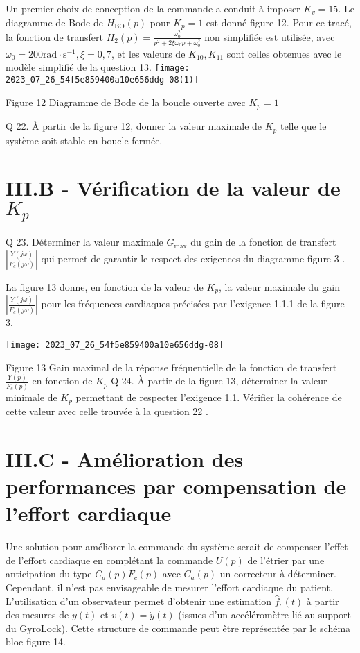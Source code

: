 Un premier choix de conception de la commande a conduit à imposer $K_{v}=15$. Le diagramme de Bode de $H_{\mathrm{BO}}(p)$ pour $K_{p}=1$ est donné figure 12. Pour ce tracé, la fonction de transfert $H_{2}(p)=\frac{\omega_{0}^{2}}{p^{2}+2 \xi \omega_{0} p+\omega_{0}^{2}}$ non simplifiée est utilisée, avec $\omega_{0}=200 \mathrm{rad} \cdot \mathrm{s}^{-1}, \xi=0,7$, et les valeurs de $K_{10}, K_{11}$ sont celles obtenues avec le modèle simplifié de la question 13.
\texttt{[image: 2023\_07\_26\_54f5e859400a10e656ddg-08(1)]}

Figure 12 Diagramme de Bode de la boucle ouverte avec $K_{p}=1$

Q 22. À partir de la figure 12, donner la valeur maximale de $K_{p}$ telle que le système soit stable en boucle fermée.

\section{III.B - Vérification de la valeur de $K_{p}$}
Q 23. Déterminer la valeur maximale $G_{\max }$ du gain de la fonction de transfert $\left|\frac{Y(j \omega)}{F_{c}(j \omega)}\right|$ qui permet de garantir le respect des exigences du diagramme figure 3 .

La figure 13 donne, en fonction de la valeur de $K_{p}$, la valeur maximale du gain $\left|\frac{Y(j \omega)}{F_{c}(j \omega)}\right|$ pour les fréquences cardiaques précisées par l'exigence 1.1.1 de la figure 3.

\begin{center}
\texttt{[image: 2023\_07\_26\_54f5e859400a10e656ddg-08]}
\end{center}

Figure 13 Gain maximal de la réponse fréquentielle de la fonction de transfert $\frac{Y(p)}{F_{c}(p)}$ en fonction de $K_{p}$ Q 24. À partir de la figure 13, déterminer la valeur minimale de $K_{p}$ permettant de respecter l'exigence 1.1. Vérifier la cohérence de cette valeur avec celle trouvée à la question 22 .

\section{III.C - Amélioration des performances par compensation de l'effort cardiaque}
Une solution pour améliorer la commande du système serait de compenser l'effet de l'effort cardiaque en complétant la commande $U(p)$ de l'étrier par une anticipation du type $C_{a}(p) F_{c}(p)$ avec $C_{a}(p)$ un correcteur à déterminer. Cependant, il n'est pas envisageable de mesurer l'effort cardiaque du patient. L'utilisation d'un observateur permet d'obtenir une estimation $\hat{f}_{c}(t)$ à partir des mesures de $y(t)$ et $v(t)=\dot{y}(t)$ (issues d'un accéléromètre lié au support du GyroLock). Cette structure de commande peut être représentée par le schéma bloc figure 14.

